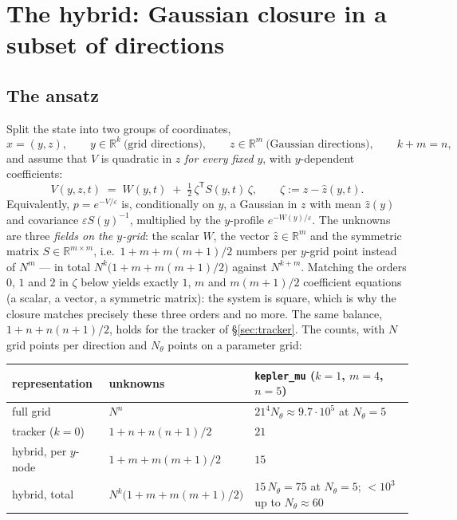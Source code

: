 \documentclass[11pt,a4paper]{article}
\newcommand{\R}{\mathbb{R}}
\newcommand{\T}{^{\mathsf T}}
\newcommand{\zh}{\hat{z}}
\newcommand{\eps}{\varepsilon}
\theoremstyle{plain}
\theoremstyle{definition}
\theoremstyle{remark}
\begin{document}
\section{The hybrid: Gaussian closure in a subset of directions}
\label{sec:hybrid}

\subsection{The ansatz}

Split the state into two groups of coordinates,
\[
  x = (y, z), \qquad y\in\R^k \ \text{(grid directions)}, \qquad z\in\R^m \ \text{(Gaussian directions)},\qquad k+m=n,
\]
and assume that $V$ is quadratic in $z$ \emph{for every fixed} $y$, with $y$-dependent coefficients:
\begin{equation}
  \boxed{\;
  V(y,z,t) \;=\; W(y,t) \;+\; \tfrac12\,\zeta\T S(y,t)\,\zeta, \qquad \zeta := z - \zh(y,t).\;}
  \label{eq:ansatz_hybrid}
\end{equation}
Equivalently, $p=e^{-V/\eps}$ is, conditionally on $y$, a Gaussian in $z$ with mean $\zh(y)$ and covariance $\eps S(y)^{-1}$, multiplied by the $y$-profile $e^{-W(y)/\eps}$. The unknowns are three \emph{fields on the $y$-grid}: the scalar $W$, the vector $\zh\in\R^m$ and the symmetric matrix $S\in\R^{m\times m}$, i.e.\ $1+m+m(m+1)/2$ numbers per $y$-grid point instead of $N^m$ --- in total $N^k\big(1+m+m(m+1)/2\big)$ against $N^{k+m}$. Matching the orders $0$, $1$ and $2$ in $\zeta$ below yields exactly $1$, $m$ and $m(m+1)/2$ coefficient equations (a scalar, a vector, a symmetric matrix): the system is square, which is why the closure matches precisely these three orders and no more. The same balance, $1+n+n(n+1)/2$, holds for the tracker of \S\ref{sec:tracker}. The counts, with $N$ grid points per direction and $N_\theta$ points on a parameter grid:
\begin{center}\small
\begin{tabular}{@{}lll@{}}
\toprule
representation & unknowns & \texttt{kepler\_mu} ($k=1$, $m=4$, $n=5$) \\
\midrule
full grid & $N^n$ & $21^4 N_\theta \approx 9.7\cdot10^5$ at $N_\theta=5$ \\
tracker ($k=0$) & $1+n+n(n+1)/2$ & $21$ \\
hybrid, per $y$-node & $1+m+m(m+1)/2$ & $15$ \\
hybrid, total & $N^k\big(1+m+m(m+1)/2\big)$ & $15\,N_\theta = 75$ at $N_\theta=5$; $<10^3$ up to $N_\theta\approx60$ \\
\bottomrule
\end{tabular}
\end{center}
\end{document}
